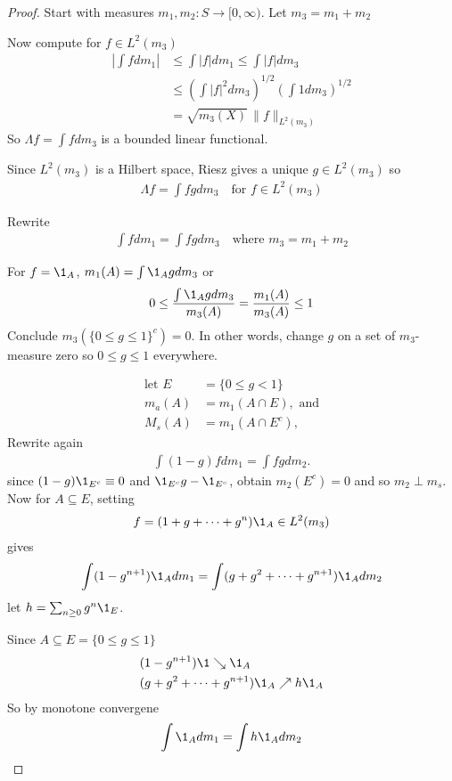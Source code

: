 \begin{proof}
	Start with measures $m_1, m_2 :S \to [0,\infty)$.
	Let  $m_3 = m_1 + m_2$

	Now compute for  $f \in L^2 (m_3)$ 
	\begin{align*}
		\left| \int f dm_1 \right| &\leq \int |f| dm_1 \leq \int |f| dm_3 \\
						&\leq \left( \int |f|^2 dm_3 \right)^{1/2} \left( \int 1 dm_3 \right)^{1/2}\\
						&= \sqrt{m_3 (X)} \, \|f\|_{L^{2}(m_3)}
	\end{align*} 
	So $\Lambda f = \int f dm_3$ is a bounded linear functional.

	Since $L^{2} (m_3)$ is a Hilbert space, Riesz gives a unique $g \in L^{2} (m_3)$ so 
	\begin{align*}
		\Lambda f = \int f g dm_3 \quad \text{for } f \in L^{2}(m_3)
	\end{align*} 

	Rewrite
	\begin{align*}
		\int f dm_1 = \int f g d m_3 \quad \text{where $m_3 = m_1 + m_2$}
	\end{align*} 

	For $f = \1_{A}$, $m_1 (A) = \int \1_{A} g dm_3$ or
	\begin{align*}
		0 \leq \frac{\int \1_{A} g dm_3}{m_3 (A)} = \frac{ m_1 (A)}{m_3 (A)} \leq 1
	\end{align*} 
	Conclude $m_3 (\{0 \leq g \leq 1\}^c) = 0$. In other words, change $g$ on a set of $m_3$-measure zero so $0 \leq g \leq 1$ everywhere.

	\begin{align*}
		\text{let  } E &= \{ 0 \leq g < 1 \} \\
		m_a (A) &= m_1 (A \cap E), \text{ and} \\
		M_s (A) &= m_1 (A \cap E^c),
	\end{align*} 
	Rewrite again
	\begin{align*}
		\int (1 - g) f dm_1 = \int fg dm_2.
	\end{align*} 
	since $(1 - g) \1_{E^c} \equiv 0$ and $\1_{E^c} g - \1_{E^c}$, obtain $m_2 (E^c) = 0$
	and so $m_2 \perp m_s$.  \\


	Now for  $A \subseteq E$, setting
	\begin{align*}
		f = (1 + g + \cdots + g^n) \1_{A } \in L^2 (m_3)
	\end{align*} gives
	\begin{align*}
		\int ( 1 - g^{n+1}) \1_{A} dm_1 = \int (g + g^2 + \cdots + g^{n+1}) \1_{A} dm_2
	\end{align*} 
	let $h = \sum_{n \geq 0} g^{n} \1_{E}$.

	Since $A \subseteq E = \{ 0 \leq g \leq 1\}$
	\begin{align*}
		&(1 - g^{n+1}) \1 \searrow \1_{A} \\
		&(g + g^2 + \cdots + g^{n+1} ) \1_{A} \nearrow h \1_{A}
	\end{align*} 
	So by monotone convergene
	\begin{align*}
		\int \1_{A} dm_1 = \int h \1_{A} dm_2
	\end{align*} 
\end{proof}
